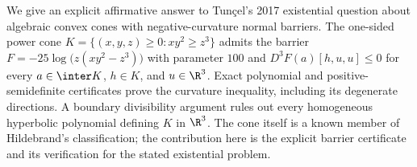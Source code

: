 We give an explicit affirmative answer to Tun\c{c}el's 2017 existential
question about algebraic convex cones with negative-curvature normal
barriers. The one-sided power cone
$K=\{(x,y,z)\geq0:xy^2\geq z^3\}$ admits the barrier
$F=-25\log\bigl(z(xy^2-z^3)\bigr)$ with parameter $100$ and
$D^3F(a)[h,u,u]\leq0$ for every $a\in\inter K$, $h\in K$, and
$u\in\R^3$. Exact polynomial and positive-semidefinite certificates prove
the curvature inequality, including its degenerate directions. A boundary
divisibility argument rules out every homogeneous hyperbolic polynomial
defining $K$ in $\R^3$. The cone itself is a known member of Hildebrand's
classification; the contribution here is the explicit barrier certificate
and its verification for the stated existential problem.
